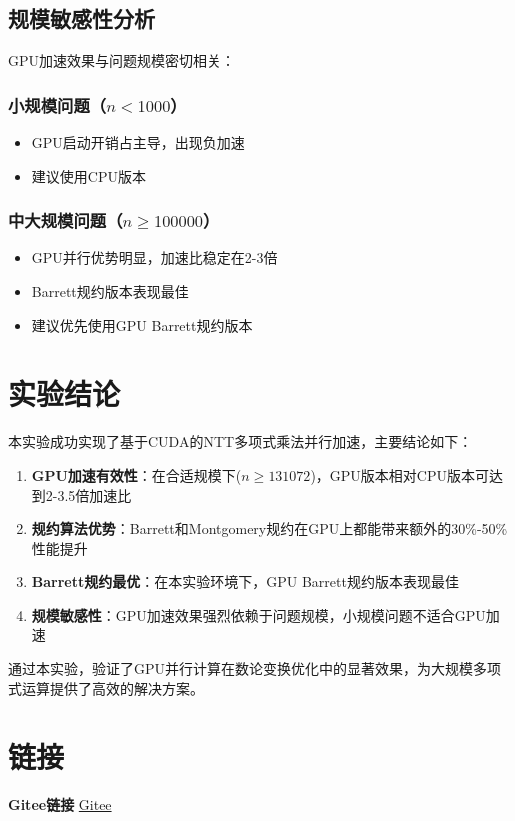 \documentclass[a4paper]{article}
\begin{document}
	\subsection{规模敏感性分析}
	
	GPU加速效果与问题规模密切相关：
	
	\subsubsection{小规模问题（$n < 1000$）}
	\begin{itemize}
		\item GPU启动开销占主导，出现负加速
		\item 建议使用CPU版本
	\end{itemize}
	
	\subsubsection{中大规模问题（$n \geq 100000$）}
	\begin{itemize}
		\item GPU并行优势明显，加速比稳定在2-3倍
		\item Barrett规约版本表现最佳
		\item 建议优先使用GPU Barrett规约版本
	\end{itemize}
	
	
	\section{实验结论}
	
	本实验成功实现了基于CUDA的NTT多项式乘法并行加速，主要结论如下：
	
	\begin{enumerate}
		\item \textbf{GPU加速有效性}：在合适规模下($n \geq 131072$)，GPU版本相对CPU版本可达到2-3.5倍加速比
		\item \textbf{规约算法优势}：Barrett和Montgomery规约在GPU上都能带来额外的30\%-50\%性能提升
		\item \textbf{Barrett规约最优}：在本实验环境下，GPU Barrett规约版本表现最佳
		\item \textbf{规模敏感性}：GPU加速效果强烈依赖于问题规模，小规模问题不适合GPU加速
	\end{enumerate}
	
	通过本实验，验证了GPU并行计算在数论变换优化中的显著效果，为大规模多项式运算提供了高效的解决方案。


\section{链接}
\textbf{Gitee链接}  \href{https://gitee.com/sky_whale/parallel-programming-with-nku}{Gitee}
\end{document}
